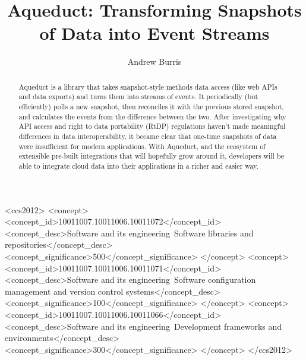 \documentclass[manuscript,review,anonymous]{acmart}
\begin{document}
\title{Aqueduct: Transforming Snapshots of Data into Event Streams}

\author{Andrew Burris}

\renewcommand{\shortauthors}{Lastname, et al.}

\begin{abstract}
  Aqueduct is a library that takes snapshot-style methods data access (like web APIs and data exports) and turns them into streams of events. 
  It periodically (but efficiently) polls a new snapshot, then reconciles it with the previous stored snapshot, and calculates the events from the difference between the two. 
  After investigating why API access and right to data portability (RtDP) regulations haven't made meaningful differences in data interoperability, it became clear that one-time snapshots of data were insufficient for modern applications. 
  With Aqueduct, and the ecosystem of extensible pre-built integrations that will hopefully grow around it, developers will be able to integrate cloud data into their applications in a richer and easier way.
\end{abstract}

\begin{CCSXML}
  <ccs2012>
     <concept>
         <concept_id>10011007.10011006.10011072</concept_id>
         <concept_desc>Software and its engineering~Software libraries and repositories</concept_desc>
         <concept_significance>500</concept_significance>
         </concept>
     <concept>
         <concept_id>10011007.10011006.10011071</concept_id>
         <concept_desc>Software and its engineering~Software configuration management and version control systems</concept_desc>
         <concept_significance>100</concept_significance>
         </concept>
     <concept>
         <concept_id>10011007.10011006.10011066</concept_id>
         <concept_desc>Software and its engineering~Development frameworks and environments</concept_desc>
         <concept_significance>300</concept_significance>
         </concept>
   </ccs2012>
\end{CCSXML}
  
\end{document}
